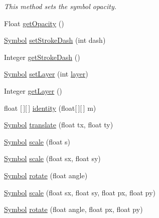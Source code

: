 \begin{DoxyCompactItemize}
\begin{DoxyCompactList}\small\item\em This method sets the symbol opacity. \end{DoxyCompactList}\item 
Float \hyperlink{classbridges_1_1base_1_1_symbol_a0135a9633599ee1a463f7bd83c425d02}{get\+Opacity} ()
\item 
\hyperlink{classbridges_1_1base_1_1_symbol}{Symbol} \hyperlink{classbridges_1_1base_1_1_symbol_ad36224ec7cb588dbbaa8040ef59ffbfc}{set\+Stroke\+Dash} (int dash)
\item 
Integer \hyperlink{classbridges_1_1base_1_1_symbol_a31ff460ae6b24ed968c1045e2533a967}{get\+Stroke\+Dash} ()
\item 
\hyperlink{classbridges_1_1base_1_1_symbol}{Symbol} \hyperlink{classbridges_1_1base_1_1_symbol_ad3379aae13939c3cb8aa8b3144ea9bac}{set\+Layer} (int \hyperlink{classbridges_1_1base_1_1_symbol_ad717768b1cd7510be1f4b9049fd04c1f}{layer})
\item 
Integer \hyperlink{classbridges_1_1base_1_1_symbol_ac5048d3027a5ba930ad66c490b55e2e6}{get\+Layer} ()
\item 
float \mbox{[}$\,$\mbox{]}\mbox{[}$\,$\mbox{]} \hyperlink{classbridges_1_1base_1_1_symbol_a26e22be6446757ba7e05f0519ad0167c}{identity} (float\mbox{[}$\,$\mbox{]}\mbox{[}$\,$\mbox{]} m)
\item 
\hyperlink{classbridges_1_1base_1_1_symbol}{Symbol} \hyperlink{classbridges_1_1base_1_1_symbol_a6313c517510bd2363d5c3e46a34f1312}{translate} (float tx, float ty)
\item 
\hyperlink{classbridges_1_1base_1_1_symbol}{Symbol} \hyperlink{classbridges_1_1base_1_1_symbol_a34c091fbe99b1e16a1648e66eca41253}{scale} (float s)
\item 
\hyperlink{classbridges_1_1base_1_1_symbol}{Symbol} \hyperlink{classbridges_1_1base_1_1_symbol_ac0b434638e271e80eca52ca0306f64bf}{scale} (float sx, float sy)
\item 
\hyperlink{classbridges_1_1base_1_1_symbol}{Symbol} \hyperlink{classbridges_1_1base_1_1_symbol_a1104bb7acb941b8fa7325eec8fec0017}{rotate} (float angle)
\item 
\hyperlink{classbridges_1_1base_1_1_symbol}{Symbol} \hyperlink{classbridges_1_1base_1_1_symbol_a39c23fde67b1cfce4ef09b84c5a4b10e}{scale} (float sx, float sy, float px, float py)
\item 
\hyperlink{classbridges_1_1base_1_1_symbol}{Symbol} \hyperlink{classbridges_1_1base_1_1_symbol_a641536133905ee0141d87ba928cdc451}{rotate} (float angle, float px, float py)

\end{DoxyCompactItemize}

